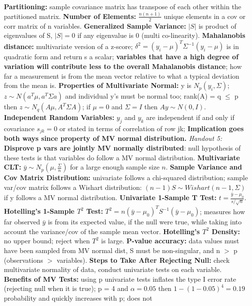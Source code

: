 \documentclass[9pt]{extarticle}
\begin{document}
\textbf{Partitioning:} sample covariance matrix has transpose of each other 
within the partitioned matrix.
\textbf{Number of Elements:} $\frac{n(n+1)}{2}$ unique elements in a 
cov or corr matrix of n variables.
\textbf{Generalized Sample Variance:} $|S|$ is product of eigenvalues of S,  
$|S| = 0$ if any eigenvalue is 0 (multi co-linearity).
\textbf{Mahalanobis distance:} multivariate version of a z-score;
$\delta^2 = (y_i - \mu)^T\Sigma^{-1}(y_i - \mu)$ is in quadratic form and 
return s a scalar; \textbf{variables that have a high degree of variation
will contribute less to the overall Mahalanobis distance}; how far a 
measurement is from the mean vector relative to what a typical deviation from 
the mean is.
\textbf{Properties of Multivariate Normal:} y is $N_p(y_i, \Sigma)$; 
$z \sim N(a^T\mu, a^T\Sigma a)$ and individual y's must be normal too; 
rank(A) = q $\leq$ p then $z \sim N_q(A\mu, A^T\Sigma A)$; if $\mu = 0$ and 
$\Sigma = I$ then $Ay \sim N(0, I)$.
\textbf{Independent Random Variables:} $y_j$ and $y_k$ are independent if
and only if covariance $s_{jk} = 0$ or stated in terms of correlation of row jk;
\textbf{Implication goes both ways since property of MV normal distribution.} 
\textit{Handout 5:}
\textbf{Disprove p vars are jointly MV normally distributed}: null
hypothesis of these tests is that variables do follow a MV normal distribution.
\textbf{Multivariate CLT:} $\bar{y} \sim N_p(\mu, \frac{\Sigma}{n})$ for a large 
enough sample size $n$.
\textbf{Sample Variance and Cov Matrix Distribution:} univariate follows a 
chi-squared distribution; sample var/cov matrix follows a Wishart distribution:
$(n-1)S \sim Wishart(n-1, \Sigma)$ if y follows a MV normal distribution.
\textbf{Univariate 1-Sample T Test:} $t = \frac{\bar{y} - \mu_0}{s/\sqrt{n}}$.
\textbf{Hotelling's 1-Sample $T^2$ Test:} $T^2 = n(\bar{y} - \mu_0)^TS^{-1}
(\bar{y} - \mu_0)$; measures how far observed $\bar{y}$ is from its expected
value, if the null were true, while taking into account the variance/cov of the 
sample mean vector.
\textbf{Hotelling's $T^2$ Density:} no upper bound; reject when $T^2$ is large.
\textbf{P-value accuracy:} data values must have been sampled from MV normal 
dist, S must be non-singular, and n $>$ p (observations $>$ variables).
\textbf{Steps to Take After Rejecting Null:} check multivariate normality of 
data, conduct univariate tests on each variable.
\textbf{Benefits of MV Tests:} using p univariate tests inflates the type I
error rate (rejecting null when it is true); p = 4 and $\alpha = 0.05$ then
$1 - (1 - 0.05)^4 = 0.19$ probability and quickly increases with p; does not
\end{document}
